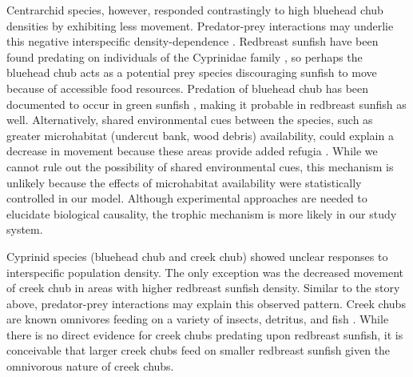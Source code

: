 \documentclass[11pt, class=article, crop=false]{standalone}
\begin{document}
Centrarchid species, however, responded contrastingly to high bluehead chub densities by exhibiting less movement. Predator-prey interactions may underlie this negative interspecific density-dependence \citep{jacobHabitatMatchingSpatial2015}. Redbreast sunfish have been found predating on individuals of the Cyprinidae family \citep{borrelliPuttingLakeTogether2023}, so perhaps the bluehead chub acts as a potential prey species discouraging sunfish to move because of accessible food resources. Predation of bluehead chub has been documented to occur in green sunfish \citep{lemlySuppressionNativeFish1985}, making it probable in redbreast sunfish as well. Alternatively, shared environmental cues between the species, such as greater microhabitat (undercut bank, wood debris) availability, could explain a decrease in movement because these areas provide added refugia \citep{careyEffectsLittoralHabitat2010}. While we cannot rule out the possibility of shared environmental cues, this mechanism is unlikely because the effects of microhabitat availability were statistically controlled in our model. Although experimental approaches are needed to elucidate biological causality, the trophic mechanism is more likely in our study system. 

Cyprinid species (bluehead chub and creek chub) showed unclear responses to interspecific population density. The only exception was the decreased movement of creek chub in areas with higher redbreast sunfish density. Similar to the story above, predator-prey interactions may explain this observed pattern. Creek chubs are known omnivores feeding on a variety of insects, detritus, and fish \citep{champagneRiparianBuffersMaintain2022, leonardApplicationTestingIndex1986, quistSummerFoodHabits2006}. While there is no direct evidence for creek chubs predating upon redbreast sunfish, it is conceivable that larger creek chubs feed on smaller redbreast sunfish given the omnivorous nature of creek chubs.
\end{document}
